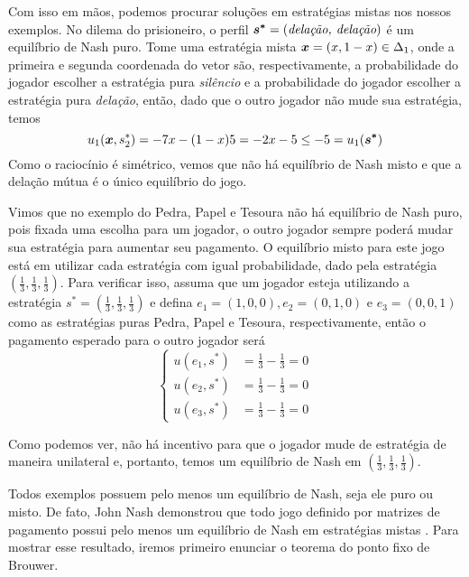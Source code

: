 Com isso em mãos, podemos procurar soluções em estratégias mistas nos nossos exemplos. No dilema do prisioneiro, o perfil $\boldsymbol{s^*}=(\textit{delação, delação})$ é um equilíbrio de Nash puro. Tome uma estratégia mista $\boldsymbol{x}=(x,1-x)\in\Delta_1$, onde a primeira e segunda coordenada do vetor são, respectivamente, a probabilidade do jogador escolher a estratégia pura \textit{silêncio} e a probabilidade do jogador escolher a estratégia pura \textit{delação}, então, dado que o outro jogador não mude sua estratégia, temos
\begin{equation*}
    u_1(\boldsymbol{x},s^*_2)=-7x-(1-x)5=-2x-5\leq -5 = u_1(\boldsymbol{s^*})
\end{equation*}
Como o raciocínio é simétrico, vemos que não há equilíbrio de Nash misto e que a delação mútua é o único equilíbrio do jogo.

Vimos que no exemplo do Pedra, Papel e Tesoura não há equilíbrio de Nash puro, pois fixada uma escolha para um jogador, o outro jogador sempre poderá mudar sua estratégia para aumentar seu pagamento. O equilíbrio misto para este jogo está em utilizar cada estratégia com igual probabilidade, dado pela estratégia $(\frac{1}{3},\frac{1}{3},\frac{1}{3})$. Para verificar isso, assuma que um jogador esteja utilizando a estratégia $s^*=(\frac{1}{3},\frac{1}{3},\frac{1}{3})$ e defina $e_1=(1,0,0),e_2=(0,1,0)$ e $e_3=(0,0,1)$ como as estratégias puras Pedra, Papel e Tesoura, respectivamente, então o pagamento esperado para o outro jogador será
\begin{equation}
    \left\{\begin{matrix}
        u(e_1,s^*) & = \frac{1}{3}-\frac{1}{3} =0\\ 
        u(e_2,s^*) & = \frac{1}{3}-\frac{1}{3} =0\\ 
        u(e_3,s^*) & = \frac{1}{3}-\frac{1}{3} =0
    \end{matrix}\right.
\end{equation}

Como podemos ver, não há incentivo para que o jogador mude de estratégia de maneira unilateral e, portanto, temos um equilíbrio de Nash em $(\frac{1}{3},\frac{1}{3},\frac{1}{3})$.

Todos exemplos possuem pelo menos um equilíbrio de Nash, seja ele puro ou misto. De fato, John Nash demonstrou que todo jogo definido por matrizes de pagamento possui pelo menos um equilíbrio de Nash em estratégias mistas \cite{nash1950equilibrium}. Para mostrar esse resultado, iremos primeiro enunciar o teorema do ponto fixo de Brouwer.

